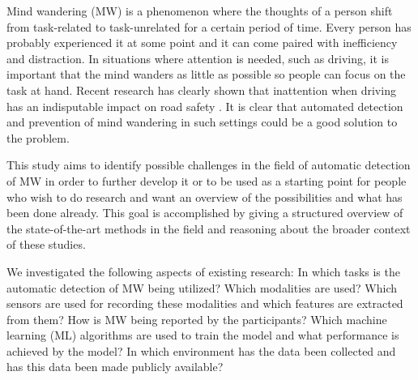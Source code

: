Mind wandering (MW) is a phenomenon where the thoughts of a person shift from task-related to task-unrelated for a certain period of time.
Every person has probably experienced it at some point and it can come paired with inefficiency and distraction. 
In situations where attention is needed, such as driving, it is important that the mind wanders as little as possible so people can focus on the task at hand. 
Recent research has clearly shown that inattention when driving has an indisputable impact on road safety \cite{berthie2015restless}. 
It is clear that automated detection and prevention of mind wandering in such settings could be a good solution to the problem. 

This study aims to identify possible challenges in the field of automatic detection of MW in order to further develop it or to be used as a starting point for people who wish to do research and want an overview of the possibilities and what has been done already. This goal is accomplished by giving a structured overview of the state-of-the-art methods in the field and reasoning about the broader context of these studies.

We investigated the following aspects of existing research:
In which tasks is the automatic detection of MW being utilized? Which modalities are used? Which sensors are used for recording these modalities and which features are extracted from them? How is MW being reported by the participants? Which machine learning (ML) algorithms are used to train the model and what performance is achieved by the model? In which environment has the data been collected and has this data been made publicly available? 
